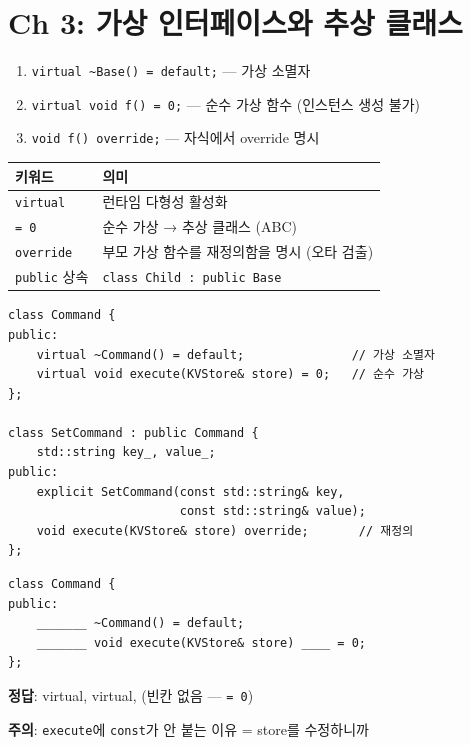 \documentclass[11pt,a4paper]{article}
\newcommand{\code}[1]{\texttt{#1}}
\begin{document}
\section{Ch 3: 가상 인터페이스와 추상 클래스}

\begin{conceptbox}[title={가상 인터페이스 필수 3요소}]
\begin{enumerate}[nosep]
\item \code{virtual \~{}Base() = default;} --- 가상 소멸자
\item \code{virtual void f() = 0;} --- 순수 가상 함수 (인스턴스 생성 불가)
\item \code{void f() override;} --- 자식에서 override 명시
\end{enumerate}
\end{conceptbox}

\begin{tabularx}{\textwidth}{@{}lX@{}}
\toprule
\textbf{키워드} & \textbf{의미} \\
\midrule
\code{virtual} & 런타임 다형성 활성화 \\
\code{= 0} & 순수 가상 → 추상 클래스 (ABC) \\
\code{override} & 부모 가상 함수를 재정의함을 명시 (오타 검출) \\
\code{public} 상속 & \code{class Child : public Base} \\
\bottomrule
\end{tabularx}

\begin{lstlisting}[style=cpp,title={Command 인터페이스}]
class Command {
public:
    virtual ~Command() = default;               // 가상 소멸자
    virtual void execute(KVStore& store) = 0;   // 순수 가상
};

class SetCommand : public Command {
    std::string key_, value_;
public:
    explicit SetCommand(const std::string& key,
                        const std::string& value);
    void execute(KVStore& store) override;       // 재정의
};
\end{lstlisting}

\begin{quizbox}[title={Q3-1: Command 인터페이스}]
\begin{lstlisting}[style=cpp,numbers=none]
class Command {
public:
    _______ ~Command() = default;
    _______ void execute(KVStore& store) ____ = 0;
};
\end{lstlisting}
\textbf{정답}: virtual, virtual, (빈칸 없음 --- \code{= 0})

\textbf{주의}: \code{execute}에 \code{const}가 안 붙는 이유 = store를 수정하니까
\end{quizbox}
\end{document}
